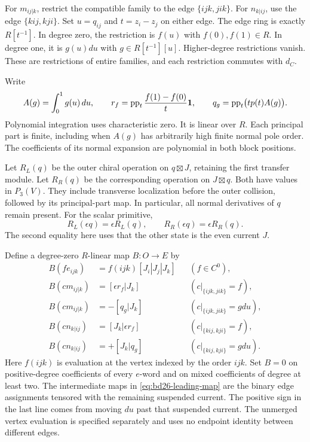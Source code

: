 For $m_{ij|k}$, restrict the compatible family to the edge $\{ijk,jik\}$.
For $n_{k|ij}$, use the edge $\{kij,kji\}$.
Set $u=q_{ij}$ and $t=z_i-z_j$ on either edge.
The edge ring is exactly $R[t^{-1}]$.
In degree zero, the restriction is $f(u)$ with $f(0),f(1)\in R$.
In degree one, it is $g(u)du$ with $g\in R[t^{-1}][u]$.
Higher-degree restrictions vanish.
These are restrictions of entire families, and each restriction commutes with $d_C$.

Write
\begin{equation}\label{eq:bd26-edge-coefficients}
 A(g)=\int_0^1g(u)\,du,\qquad
 r_f=\operatorname{pp}_t\frac{f(1)-f(0)}t\mathbf1,\qquad
 q_g=\operatorname{pp}_t\bigl(tp(t)A(g)\bigr).
\end{equation}
Polynomial integration uses characteristic zero.
It is linear over $R$.
Each principal part is finite, including when $A(g)$ has arbitrarily high finite normal pole order.
The coefficients of its normal expansion are polynomial in both block positions.

Let $R_L(q)$ be the outer chiral operation on $q\boxtimes J$, retaining the first transfer module.
Let $R_R(q)$ be the corresponding operation on $J\boxtimes q$.
Both have values in $P_3(V)$.
They include transverse localization before the outer collision, followed by its principal-part map.
In particular, all normal derivatives of $q$ remain present.
For the scalar primitive,
\[
 R_L(\epsilon q)=\epsilon R_L(q),\qquad
 R_R(\epsilon q)=\epsilon R_R(q).
\]
The second equality here uses that the other state is the even current $J$.

Define a degree-zero $R$-linear map $B:O\to E$ by
\begin{equation}\label{eq:bd26-leading-map}
 \begin{aligned}
 B(fe_{ijk})&=f(ijk)[J_i|J_j|J_k] && (f\in C^0),\\
 B(cm_{ij|k})&=[\epsilon r_f|J_k] && (c|_{\{ijk,jik\}}=f),\\
 B(cm_{ij|k})&=-[q_g|J_k] && (c|_{\{ijk,jik\}}=gdu),\\
 B(cn_{k|ij})&=[J_k|\epsilon r_f] && (c|_{\{kij,kji\}}=f),\\
 B(cn_{k|ij})&=+[J_k|q_g] && (c|_{\{kij,kji\}}=gdu).
 \end{aligned}
\end{equation}
Here $f(ijk)$ is evaluation at the vertex indexed by the order $ijk$.
Set $B=0$ on positive-degree coefficients of every $e$-word and on mixed coefficients of degree at least two.
The intermediate maps in \eqref{eq:bd26-leading-map} are the binary edge assignments tensored with the remaining suspended current.
The positive sign in the last line comes from moving $du$ past that suspended current.
The unmerged vertex evaluation is specified separately and uses no endpoint identity between different edges.

